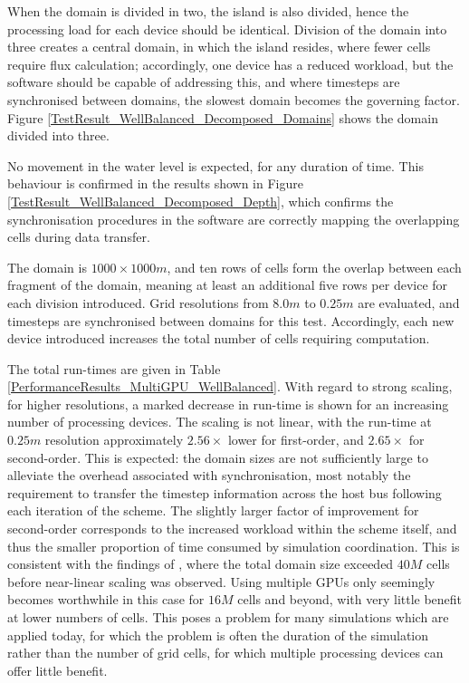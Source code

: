 When the domain is divided in two, the island is also divided, hence the processing load for each device should be identical. Division of the domain into three creates a central domain, in which the island resides, where fewer cells require flux calculation; accordingly, one device has a reduced workload, but the software should be capable of addressing this, and where timesteps are synchronised between domains, the slowest domain becomes the governing factor. Figure \ref{TestResult_WellBalanced_Decomposed_Domains} shows the domain divided into three.

No movement in the water level is expected, for any duration of time. This behaviour is confirmed in the results shown in Figure \ref{TestResult_WellBalanced_Decomposed_Depth}, which confirms the synchronisation procedures in the software are correctly mapping the overlapping cells during data transfer.

The domain is $1000 \times 1000m$, and ten rows of cells form the overlap between each fragment of the domain, meaning at least an additional five rows per device for each division introduced. Grid resolutions from $8.0m$ to $0.25m$ are evaluated, and timesteps are synchronised between domains for this test. Accordingly, each new device introduced increases the total number of cells requiring computation.

The total run-times are given in Table \ref{PerformanceResults_MultiGPU_WellBalanced}. With regard to strong scaling, for higher resolutions, a marked decrease in run-time is shown for an increasing number of processing devices. The scaling is not linear, with the run-time at $0.25m$ resolution approximately $2.56\times$ lower for first-order, and $2.65\times$ for second-order. This is expected: the domain sizes are not sufficiently large to alleviate the overhead associated with synchronisation, most notably the requirement to transfer the timestep information across the host bus following each iteration of the scheme. The slightly larger factor of improvement for second-order corresponds to the increased workload within the scheme itself, and thus the smaller proportion of time consumed by simulation coordination. This is consistent with the findings of \citet{Saetra2012}, where the total domain size exceeded $40M$ cells before near-linear scaling was observed. Using multiple GPUs only seemingly becomes worthwhile in this case for $16M$ cells and beyond, with very little benefit at lower numbers of cells. This poses a problem for many simulations which are applied today, for which the problem is often the duration of the simulation rather than the number of grid cells, for which multiple processing devices can offer little benefit.

